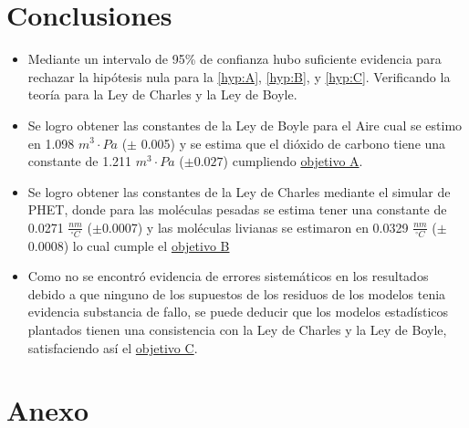 \documentclass[12pt,a4paper]{config/myConfig}
\begin{document}






\section{Conclusiones}
\label{sec:CONCLUSIONES}

\begin{itemize}
    \item Mediante un intervalo de 95\% de confianza hubo suficiente evidencia para rechazar la hipótesis nula para la \cref{hyp:A}, \cref{hyp:B}, y \cref{hyp:C}. Verificando la teoría para la Ley de Charles y la Ley de Boyle.  
    \item Se logro obtener las constantes de la Ley de Boyle para el Aire cual se estimo en 1.098 $m^3 \cdot Pa$ ($\pm$ 0.005) y se estima que el dióxido de carbono tiene una constante de 1.211 $m^3 \cdot Pa$ ($\pm 0.027$) cumpliendo \hyperref[obj:A]{objetivo A}.     
    \item Se logro obtener las constantes de la Ley de Charles mediante el simular de PHET, donde para las moléculas pesadas se estima tener una constante de 0.0271 $\frac{nm}{^\circ C}$ ($\pm$0.0007) y las moléculas livianas se estimaron en 0.0329 $\frac{nm}{^\circ C}$ ($\pm$0.0008) lo cual cumple el \hyperref[obj:B]{objetivo B}
    \item Como no se encontró evidencia de errores sistemáticos en los resultados debido a que ninguno de los supuestos de los residuos de los modelos tenia evidencia substancia de fallo, se puede deducir que los modelos estadísticos plantados tienen una consistencia con la Ley de Charles y la Ley de Boyle, satisfaciendo así el \hyperref[obj:C]{objetivo C}.
\end{itemize}


\footnotesize
\printbibliography
\normalsize

\section*{Anexo}
\label{sec:Anexo}
\end{document}
